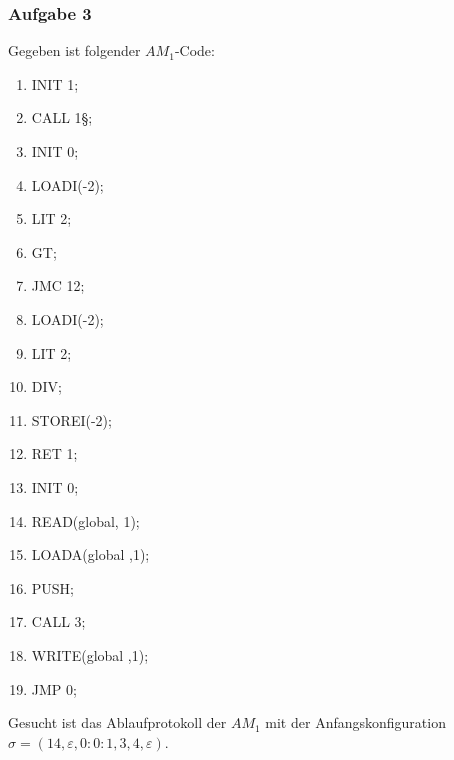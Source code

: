 \documentclass[aspectratio=1610,onlymath, ngerman]{beamer}
\renewcommand{\epsilon}{\varepsilon}
\begin{document}
	\begin{frame} \frametitle{Aufgabe 3}
	\small
		Gegeben ist folgender $AM_1$-Code: \\
		\bigskip 
		
		\begin{minipage}{\dimexpr0.33\linewidth-\fboxrule-\fboxsep}
			\begin{ttfamily}
				\begin{enumerate}[label=\arabic*:, nolistsep]
					\item INIT 1;
					\item CALL 1§;
					\item INIT 0;
					\item LOADI(-2);
					\item LIT 2;
					\item GT;
					\item JMC 12;
				\end{enumerate}
			\end{ttfamily}
		\end{minipage}
		\begin{minipage}{\dimexpr0.33\linewidth-\fboxrule-\fboxsep}
			\begin{ttfamily}
				\begin{enumerate}[label=\arabic*:, nolistsep]
					\setcounter{enumi}{7}
					\item LOADI(-2);
					\item LIT 2;
					\item DIV;
					\item STOREI(-2);
					\item RET 1;
					\item INIT 0;
					\item READ(global, 1);
				\end{enumerate}
			\end{ttfamily}
		\end{minipage}
		\begin{minipage}{\dimexpr0.33\linewidth-\fboxrule-\fboxsep}
			\begin{ttfamily}
				\begin{enumerate}[label=\arabic*:, nolistsep]
					\setcounter{enumi}{14}
					\item LOADA(global ,1);
					\item PUSH;
					\item CALL 3;
					\item WRITE(global ,1);
					\item JMP 0;

				\end{enumerate}
			\end{ttfamily}
		\end{minipage}
		
		\bigskip
		
		Gesucht ist das Ablaufprotokoll der $AM_1$ mit der Anfangskonfiguration $\sigma = (14, \epsilon, 0:0:1, 3, 4, \epsilon)$.
	\end{frame}
\end{document}
